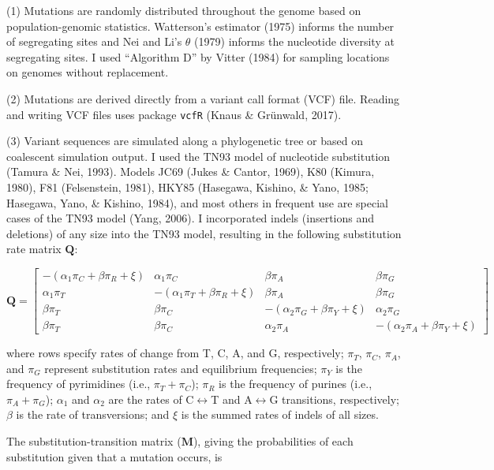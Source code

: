 \documentclass[12pt,]{article}
\begin{document}
(1) Mutations are randomly distributed throughout the genome based on
population-genomic statistics. Watterson's estimator (1975) informs the
number of segregating sites and Nei and Li's \(\theta\) (1979) informs
the nucleotide diversity at segregating sites. I used ``Algorithm D'' by
Vitter (1984) for sampling locations on genomes without replacement.

(2) Mutations are derived directly from a variant call format (VCF)
file. Reading and writing VCF files uses package \texttt{vcfR} (Knaus \&
Grünwald, 2017).

(3) Variant sequences are simulated along a phylogenetic tree or based
on coalescent simulation output. I used the TN93 model of nucleotide
substitution (Tamura \& Nei, 1993). Models JC69 (Jukes \& Cantor, 1969),
K80 (Kimura, 1980), F81 (Felsenstein, 1981), HKY85 (Hasegawa, Kishino,
\& Yano, 1985; Hasegawa, Yano, \& Kishino, 1984), and most others in
frequent use are special cases of the TN93 model (Yang, 2006). I
incorporated indels (insertions and deletions) of any size into the TN93
model, resulting in the following substitution rate matrix
\(\mathbf{Q}\):

\[
\mathbf{Q} = 
\begin{bmatrix}
-(\alpha_1\pi_C + \beta \pi_R + \xi) & \alpha_1 \pi_C                 & \beta \pi_A                    & \beta \pi_G \\
\alpha_1 \pi_T                 & -(\alpha_1\pi_T + \beta \pi_R + \xi) & \beta \pi_A                    & \beta \pi_G \\
\beta \pi_T                    & \beta \pi_C                    & -(\alpha_2\pi_G + \beta \pi_Y + \xi) & \alpha_2 \pi_G \\
\beta \pi_T                    & \beta \pi_C                    & \alpha_2 \pi_A                 & -(\alpha_2\pi_A + \beta \pi_Y + \xi)
\end{bmatrix}
\]

where rows specify rates of change from T, C, A, and G, respectively;
\(\pi_T\), \(\pi_C\), \(\pi_A\), and \(\pi_G\) represent substitution
rates and equilibrium frequencies; \(\pi_Y\) is the frequency of
pyrimidines (i.e., \(\pi_T + \pi_C\)); \(\pi_R\) is the frequency of
purines (i.e., \(\pi_A + \pi_G\)); \(\alpha_1\) and \(\alpha_2\) are the
rates of C\(\leftrightarrow\)T and A\(\leftrightarrow\)G transitions,
respectively; \(\beta\) is the rate of transversions; and \(\xi\) is the
summed rates of indels of all sizes.

The substitution-transition matrix (\(\mathbf{M}\)), giving the
probabilities of each substitution given that a mutation occurs, is
\end{document}
